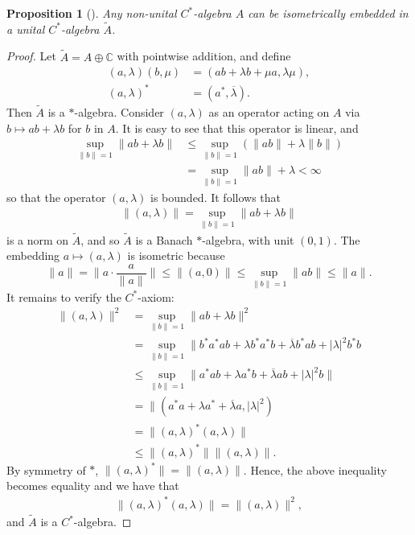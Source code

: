 \documentclass[12pt,a4paper]{report}
\theoremstyle{plain}
\newtheorem*{prop*}{Proposition}
\theoremstyle{definition}
\newcommand{\1}{\mathbbm{1}}
\newcommand{\C}{\mathbb{C}}
\begin{document}
\begin{prop*}[{\cite[I.1.3]{davidson96}}]
	Any non-unital $C^\ast$-algebra $A$ can be isometrically embedded in a unital $C^\ast$-algebra 
	$\tilde{A}$.
\end{prop*}
\begin{proof}
	Let $\tilde{A} = A \oplus \C$ with pointwise addition, and define
	\begin{align*}
		(a,\lambda) (b,\mu) &= (ab+\lambda b + \mu a, \lambda \mu),				\\
		(a,\lambda)^\ast &= (a^\ast,\overline{\lambda}).
	\end{align*}
	Then $\tilde{A}$ is a $\ast$-algebra. 
	Consider $(a,\lambda)$ as an operator acting on $A$ via $b\mapsto ab+\lambda b$ for $b$ in $A$. It 
	is easy to see that this operator is linear, and 
	\begin{align*}
				\sup_{\|b\|=1}\|ab+\lambda b\| 
		&\leq 	\sup_{\|b\|=1} (\|ab\|+ \lambda\|b\|)							\\
		&=		\sup_{\|b\|=1} \|ab\|+ \lambda < \infty
	\end{align*}
	so that the operator $(a,\lambda)$ is bounded. It follows that
	\begin{align*}
		\|(a,\lambda)\| = \sup_{\|b\|=1}\|ab+\lambda b\|
	\end{align*}
	is a norm on $\tilde{A}$, and so $\tilde{A}$ is a Banach $\ast$-algebra, with unit $(0,1)$.
	The embedding $a\mapsto(a,\lambda)$ is isometric because 
	\[
		\|a\| = \|a\cdot\frac{a}{\|a\|}\| \leq \|(a,0)\| \leq \sup_{\|b\|=1}{\|ab\|} \leq \|a\|.
	\]
	It remains to verify the $C^\ast$-axiom:
	\begin{align*}
				\|(a,\lambda)\|^2 
		&=		\sup_{\|b\|=1}{\|ab+\lambda b\|^2}								\\
		&=		\sup_{\|b\|=1}{\|b^\ast a^\ast ab 
								+\lambda b^\ast a^\ast b
								+\overline{\lambda}b^\ast a b
								+|\lambda|^2 b^\ast b}							\\
		&\leq	\sup_{\|b\|=1}{\|a^\ast ab 
								+\lambda a^\ast b
								+\overline{\lambda}a b
								+|\lambda|^2 b\|}								\\
		&=		\|(a^\ast a + \lambda a^\ast +\overline{\lambda}a,|\lambda|^2)	\\
		&= 		\|(a,\lambda)^\ast(a,\lambda)\|									\\
		&\leq	\|(a,\lambda)^\ast\| \|(a,\lambda)\|.
	\end{align*}
	By symmetry of $\ast$, $\|(a,\lambda)^\ast\| = \|(a,\lambda)\|$. 
	Hence, the above inequality becomes equality and we have that
	\begin{align*}
		\|(a,\lambda)^\ast(a,\lambda)\| = \|(a,\lambda)\|^2,
	\end{align*}
	and $\tilde A$ is a $C^\ast$-algebra.
\end{proof}
\end{document}
